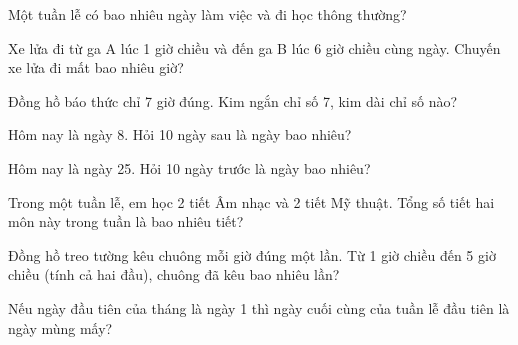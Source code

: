\begin{ex}
Một tuần lễ có bao nhiêu ngày làm việc và đi học thông thường?
\end{ex}

\begin{ex}
Xe lửa đi từ ga A lúc 1 giờ chiều và đến ga B lúc 6 giờ chiều cùng ngày. Chuyến xe lửa đi mất bao nhiêu giờ?
\end{ex}

\begin{ex}
Đồng hồ báo thức chỉ 7 giờ đúng. Kim ngắn chỉ số 7, kim dài chỉ số nào?
\end{ex}

\begin{ex}
Hôm nay là ngày 8. Hỏi 10 ngày sau là ngày bao nhiêu?
\end{ex}

\begin{ex}
Hôm nay là ngày 25. Hỏi 10 ngày trước là ngày bao nhiêu?
\end{ex}

\begin{ex}
Trong một tuần lễ, em học 2 tiết Âm nhạc và 2 tiết Mỹ thuật. Tổng số tiết hai môn này trong tuần là bao nhiêu tiết?
\end{ex}

\begin{ex}
Đồng hồ treo tường kêu chuông mỗi giờ đúng một lần. Từ 1 giờ chiều đến 5 giờ chiều (tính cả hai đầu), chuông đã kêu bao nhiêu lần?
\end{ex}

\begin{ex}
Nếu ngày đầu tiên của tháng là ngày 1 thì ngày cuối cùng của tuần lễ đầu tiên là ngày mùng mấy?
\end{ex}
